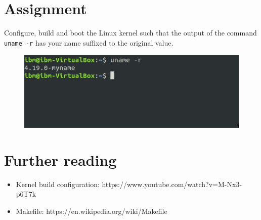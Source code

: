 \documentclass{beamer}
\begin{document}
\section{Assignment}
\begin{frame}
  Configure, build and boot the Linux kernel such that the output of the
  command \texttt{uname -r} has your name suffixed to the original value. 
    \begin{figure}[h!]
      \centering
      \includegraphics[scale=0.5]{images/assignment.png}
    \end{figure}
\end{frame}

\section{Further reading}

\begin{frame}
  \begin{itemize}
  \item Kernel build configuration: https://www.youtube.com/watch?v=M-Nx3-p6T7k
  \item Makefile: https://en.wikipedia.org/wiki/Makefile
  \end{itemize}
  
\end{frame}
\end{document}
